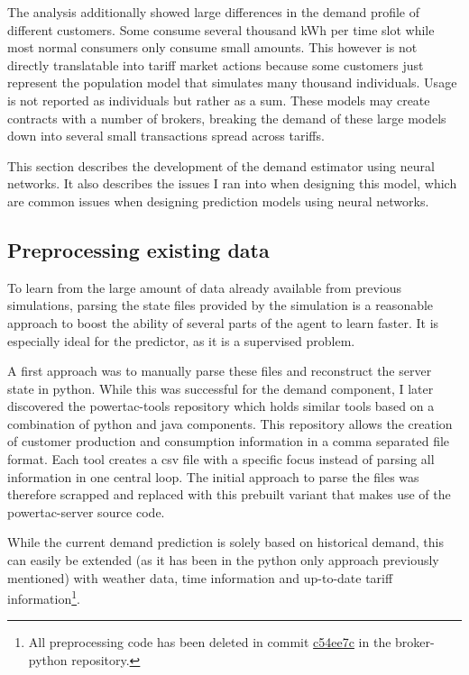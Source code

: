 The analysis additionally showed large differences in the demand profile of different customers. Some consume several thousand
\ac{kWh} per time slot while most normal consumers only consume small amounts. This however is not directly
translatable into tariff market actions because some customers just represent the population model that simulates many
thousand individuals. Usage is not reported as individuals but rather as a sum. These models may create contracts with a
number of brokers, breaking the demand of these large models down into several small transactions spread across tariffs.

This section describes the development of the demand estimator using neural networks. It also describes the issues
I ran into when designing this model, which are common issues when designing prediction models using neural networks.

\subsection{Preprocessing existing data}
\label{sub:preprocessing}


To learn from the large amount of data already available from previous simulations, parsing the state files provided by
the simulation is a reasonable approach to boost the ability of several parts of the agent to learn faster. It is
especially ideal for the predictor, as it is a supervised problem.

A first approach was to manually parse these files and reconstruct the server state in python.
While this was successful for the demand component, I later discovered the powertac-tools repository which holds similar tools
based on a combination of python and java components. This repository allows the creation of customer production and
consumption information in a comma separated file format. Each tool creates a csv file with a specific focus instead of
parsing all information in one central loop. The initial approach to parse the files was therefore scrapped
and replaced with this prebuilt variant that makes use of the powertac-server source code. 

While the current demand prediction is solely based on historical demand, this can easily be extended (as it has been in
the python only approach previously mentioned) with weather data, time information and up-to-date tariff
information\footnote{All preprocessing code has been deleted in commit
    \href{https://github.com/pascalwhoop/broker-python/commit/c54ee7c05585d15462f40e2be6850343e8aea27a}{c54ee7c} in the
broker-python repository.}.



